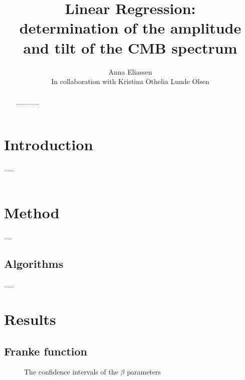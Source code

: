 \documentclass{emulateapj}
\begin{document}
\title{Linear Regression: \\ determination of the amplitude and tilt of the CMB spectrum}

\author{Anna Eliassen  \\ 
In collaboration with Kristina Othelia Lunde Olsen}






\begin{abstract}
..............
\end{abstract}

\section{Introduction}
\label{sec:introduction}

.....\\\\




\section{Method}
\label{sec:method}

....


\subsection{Algorithms}
\label{sec:data}

.....

\newpage
\section{Results}
\label{sec:results}
\subsection{Franke function}

\begin{figure}[h]
\mbox{}
\caption{The confidence intervals of the $\beta$ parameters}
\label{fig:figure_label}
\end{figure}
\end{document}
